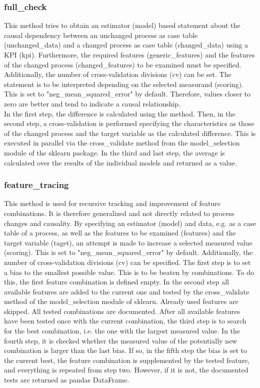     \subsubsection*{full\_check}
    This method tries to obtain an estimator (model) based statement about the causal dependency between an unchanged process as case table (unchanged\_data) and a changed process as case table (changed\_data) using a KPI (kpi). Furthermore, the required features (generic\_features) and the features of the changed process (changed\_features) to be examined must be specified. Additionally, the number of cross-validation divisions (cv) can be set. The statement is to be interpreted depending on the selected measurand (scoring). This is set to "neg\_mean\_squared\_error" by default. Therefore, values closer to zero are better and tend to indicate a causal relationship.\\
    In the first step, the difference is calculated using the  method. Then, in the second step, a cross-validation is performed specifying the characteristics as those of the changed process and the target variable as the calculated difference. This is executed in parallel via the cross\_validate method from the model\_selection module of the sklearn package. In the third and last step, the average is calculated over the results of the individual models and returned as a value.\label{fullcheck}
    \subsubsection*{feature\_tracing}
    This method is used for recursive tracking and improvement of feature combinations. It is therefore generalized and not directly related to process changes and causality. By specifying an estimator (model) and data, e.g. as a case table of a process, as well as the features to be examined (features) and the target variable (taget), an attempt is made to increase a selected measured value (scoring). This is set to "neg\_mean\_squared\_error" by default. Additionally, the number of cross-validation divisions (cv) can be specified.
    The first step is to set a bias to the smallest possible value. This is to be beaten by combinations. To do this, the first feature combination is defined empty. In the second step all available features are added to the current one and tested by the cross\_validate method of the model\_selection module of sklearn. Already used features are skipped. All tested combinations are documented. After all available features have been tested once with the current combination, the third step is to search for the best combination, i.e. the one with the largest measured value. In the fourth step, it is checked whether the measured value of the potentially new combination is larger than the last bias. If so, in the fifth step the bias is set to the current best, the feature combination is supplemented by the tested feature, and everything is repeated from step two. However, if it is not, the documented tests are returned as pandas DataFrame.\label{tracing}


